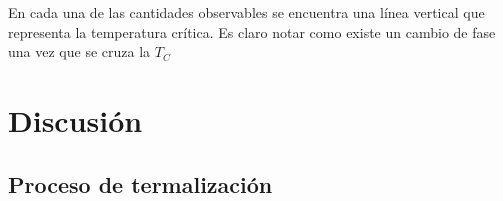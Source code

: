 \documentclass[11pt,a4paper]{article}
\begin{document}
\newpage
En cada una de las cantidades observables se encuentra una línea vertical que representa la temperatura crítica. Es claro notar como existe un cambio de fase una vez que se cruza la $T_C$
\begin{figure}[h!]
\centering
{}
\end{figure}

\section{Discusión}
\subsection{Proceso de termalización}
\end{document}
